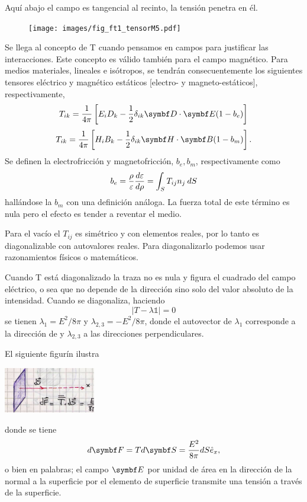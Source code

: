 \documentclass[10pt,oneside]{CBFT_book}
\begin{document}
Aquí abajo el campo es tangencial al recinto, la tensión penetra en él.

\begin{figure}[htb]
	\begin{center}
	\texttt{[image: images/fig\_ft1\_tensorM5.pdf]}	 
	\end{center}
	\caption{}
\end{figure} 

Se llega al concepto de T cuando pensamos en campos para justificar las interacciones.
Este concepto es válido también para el campo magnético.
Para medios materiales, lineales e isótropos, se tendrán consecuentemente los siguientes tensores
eléctrico y magnético estáticos [electro- y magneto-estáticos], respectivamente,
\[
	T_{ik} = \frac{1}{4\pi} \left[ E_iD_k - \frac{1}{2}\delta_{ik} \pe{D}{E}(1-b_e) \right] 
\]
\[
	T_{ik} = \frac{1}{4\pi} \left[ H_iB_k - \frac{1}{2}\delta_{ik} \pe{H}{B}(1-b_m)  \right] .
\]
Se definen la electrofricción y magnetofricción, $b_e,b_m$, respectivamente como
\[
	b_e = \frac{\rho}{\varepsilon} \frac{d^{\hspace{-0.05em}} {\varepsilon}}{d {\rho}^{\hspace{-0.05em}}}  = \int_S T_{ij} n_j \: dS
\]
hallándose la $b_m$ con una definición análoga.
La fuerza total de este término es nula pero el efecto es tender a reventar el medio.

Para el vacío el $T_{ij}$ es simétrico y con elementos reales, por lo tanto es diagonalizable 
con autovalores reales.
Para diagonalizarlo podemos usar razonamientos físicos o matemáticos.

Cuando T está diagonalizado la traza no es nula y figura el cuadrado del campo eléctrico,
o sea que no depende de la dirección sino solo del valor absoluto de la intensidad.
Cuando se diagonaliza, haciendo
\[
	| T - \lambda \mathbb{1} | = 0
\]
se tienen $\lambda_1 = E^2 / 8\pi$ y $\lambda_{2,3} = - E^2 / 8\pi$, donde el
autovector de $\lambda_1$ corresponde a la dirección de  y $\lambda_{2,3}$
a las direcciones perpendiculares.

El siguiente figurín ilustra

\includegraphics[width=0.3\textwidth]{images/fig_ft1_tensorMax_B.jpg}

donde se tiene
\[
	d\vb{F} = T d\vb{S} = \frac{E^2}{8\pi} dS \hat{e}_x,
\]
o bien en palabras; el campo $\vb{E}$ por unidad de área en la dirección de la normal a la superficie
por el elemento de superficie transmite una tensión a través de la superficie.
\end{document}
